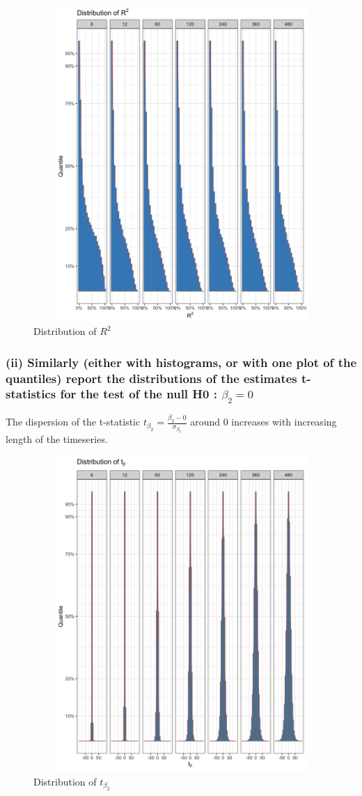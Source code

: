 \documentclass[]{article}
\begin{document}
\begin{figure}[H]
	\centering
	\includegraphics[width=14cm, height=12cm]{"./1ai_chart"}
	\caption[]{Distribution of $R^2$}
\end{figure}

\newpage
\subsubsection*{(ii) Similarly (either with histograms, or with one plot of the quantiles) report the distributions of the estimates t-statistics for the test of the null H0 : $\beta_2 = 0$}

The dispersion of the t-statistic $t_{\beta_2} = \frac{\beta_2 - 0}{\sigma_{\beta_2}}$ around 0 increases with increasing length of the timeseries.

\begin{figure}[H]
	\centering
	\includegraphics[width=14cm, height=12cm]{"./1aii_chart"}
	\caption[]{Distribution of $t_{\beta_2}$}
\end{figure}
\end{document}
